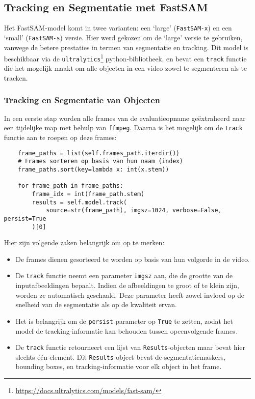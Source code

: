 \subsection{Tracking en Segmentatie met FastSAM}

Het FastSAM-model komt in twee varianten: een `large' (\texttt{FastSAM-x}) en een `small' (\texttt{FastSAM-s}) versie.
Hier werd gekozen om de `large' versie te gebruiken, vanwege de betere prestaties in termen van segmentatie en tracking.
Dit model is beschikbaar via de \texttt{ultralytics}\footnote{\url{https://docs.ultralytics.com/models/fast-sam/}} python-bibliotheek,
en bevat een \texttt{track} functie die het mogelijk maakt om alle objecten in een video zowel te segmenteren als te tracken.

\subsubsection{Tracking en Segmentatie van Objecten}

In een eerste stap worden alle frames van de evaluatieopname geëxtraheerd naar een tijdelijke map met behulp van \texttt{ffmpeg}.
Daarna is het mogelijk om de \texttt{track} functie aan te roepen op deze frames:

\begin{listing}[H]
  \begin{verbatim}
    frame_paths = list(self.frames_path.iterdir())
    # Frames sorteren op basis van hun naam (index)
    frame_paths.sort(key=lambda x: int(x.stem))

    for frame_path in frame_paths:
        frame_idx = int(frame_path.stem)
        results = self.model.track(
            source=str(frame_path), imgsz=1024, verbose=False, persist=True
        )[0]
    \end{verbatim}
  \caption[Tracking van objecten met FastSAM]{}
\end{listing}

Hier zijn volgende zaken belangrijk om op te merken:
\begin{itemize}
    \item De frames dienen gesorteerd te worden op basis van hun volgorde in de video.
    \item De \texttt{track} functie neemt een parameter \texttt{imgsz} aan, die de grootte van de inputafbeeldingen bepaalt.
    Indien de afbeeldingen te groot of te klein zijn, worden ze automatisch geschaald.
    Deze parameter heeft zowel invloed op de snelheid van de segmentatie als op de kwaliteit ervan.
    \item Het is belangrijk om de \texttt{persist} parameter op \texttt{True} te zetten, 
    zodat het model de tracking-informatie kan behouden tussen opeenvolgende frames.
    \item De \texttt{track} functie retourneert een lijst van \texttt{Results}-objecten maar bevat hier slechts één element.
    Dit \texttt{Results}-object bevat de segmentatiemaskers, bounding boxes, en tracking-informatie voor elk object in het frame.
\end{itemize}

